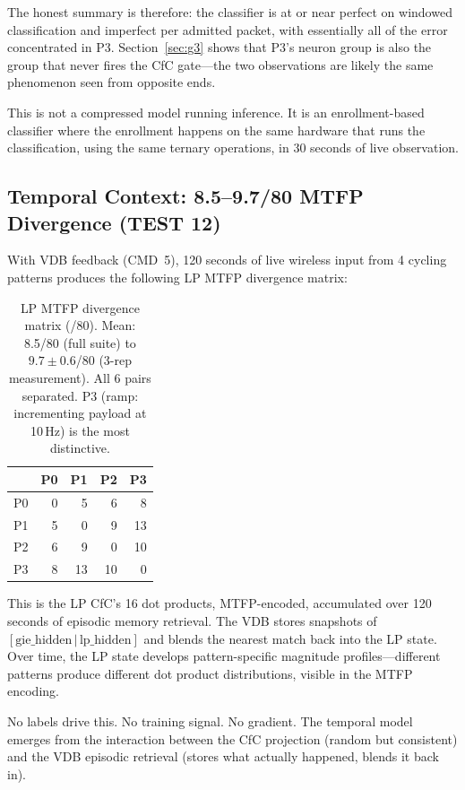 \documentclass[11pt,letterpaper]{article}
\begin{document}
The honest summary is therefore: the classifier is at or near perfect on windowed classification and imperfect per admitted packet, with essentially all of the error concentrated in P3. Section~\ref{sec:g3} shows that P3's neuron group is also the group that never fires the CfC gate---the two observations are likely the same phenomenon seen from opposite ends.

This is not a compressed model running inference. It is an enrollment-based classifier where the enrollment happens on the same hardware that runs the classification, using the same ternary operations, in 30 seconds of live observation.

\subsection{Temporal Context: 8.5--9.7/80 MTFP Divergence (TEST 12)}

With VDB feedback (CMD~5), 120 seconds of live wireless input from 4 cycling patterns produces the following LP MTFP divergence matrix:

\begin{table}[h]
\centering
\begin{tabular}{l rrrr}
\toprule
& P0 & P1 & P2 & P3 \\
\midrule
P0 & 0 & 5 & 6 & 8 \\
P1 & 5 & 0 & 9 & 13 \\
P2 & 6 & 9 & 0 & 10 \\
P3 & 8 & 13 & 10 & 0 \\
\bottomrule
\end{tabular}
\caption{LP MTFP divergence matrix (/80). Mean: 8.5/80 (full suite) to $9.7 \pm 0.6$/80 (3-rep measurement). All 6 pairs separated. P3 (ramp: incrementing payload at 10\,Hz) is the most distinctive.}
\label{tab:mtfp-matrix}
\end{table}

This is the LP CfC's 16 dot products, MTFP-encoded, accumulated over 120 seconds of episodic memory retrieval. The VDB stores snapshots of $[\text{gie\_hidden}\,|\,\text{lp\_hidden}]$ and blends the nearest match back into the LP state. Over time, the LP state develops pattern-specific magnitude profiles---different patterns produce different dot product distributions, visible in the MTFP encoding.

No labels drive this. No training signal. No gradient. The temporal model emerges from the interaction between the CfC projection (random but consistent) and the VDB episodic retrieval (stores what actually happened, blends it back in).
\end{document}
